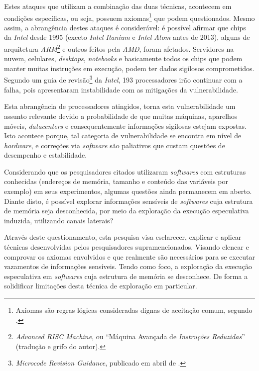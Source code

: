 \documentclass[
	article,			    %
	12pt,				    %
	oneside,			    %
	a4paper,			    %
	chapter=TITLE,		    %
	section=TITLE,		    %
	subsection=TITLE,	    %
	english,			    %
	brazil,				    %
	sumario=tradicional
]{abntex2}
\begin{document}
Estes ataques que utilizam a combinação das duas técnicas, acontecem em condições específicas, ou seja, possuem axiomas\footnote{Axiomas são regras lógicas consideradas dignas de aceitação comum, segundo .} que podem questionados. Mesmo assim, a abrangência destes ataques é considerável: é possível afirmar que chips da \emph{Intel} desde 1995 (exceto \emph{Intel Itanium} e \emph{Intel Atom} antes de 2013), alguns de arquitetura \emph{ARM}\footnote{\emph{Advanced RISC Machine}, ou ``Máquina Avançada de \emph{Instruções Reduzidas}'' (tradução e grifo do autor).} e outros feitos pela \emph{AMD}, foram afetados. Servidores na nuvem, celulares, \emph{desktops}, \emph{notebooks} e basicamente todos os chips que podem manter muitas instruções em execução, podem ter dados sigilosos comprometidos. Segundo um guia de revisão\footnote{\emph{Microcode Revision Guidance}, publicado em abril de \citeyear{intel-mug}.} da \emph{Intel}, 193 processadores irão continuar com a falha, pois apresentaram instabilidade com as mitigações da vulnerabilidade.

Esta abrangência de processadores atingidos, torna esta vulnerabilidade um assunto relevante devido a probabilidade de que muitas máquinas, aparelhos móveis, \emph{datacenters} e consequentemente informações sigilosas estejam expostas. Isto acontece porque, tal categoria de vulnerabilidade se encontra em nível de \emph{hardware}, e correções via \emph{software} são paliativos que custam questões de desempenho e estabilidade.

Considerando que os pesquisadores citados utilizaram \emph{softwares} com estruturas conhecidas (endereços de memória, tamanho e conteúdo das variáveis por exemplo) em seus experimentos, algumas questões ainda permanecem em aberto. Diante disto, é possível explorar informações sensíveis de \emph{softwares} cuja estrutura de memória seja desconhecida, por meio da exploração da execução especulativa induzida, utilizando canais laterais?

Através deste questionamento, esta pesquisa visa esclarecer, explicar e aplicar técnicas desenvolvidas pelos pesquisadores supramencionados. Visando elencar e comprovar os axiomas envolvidos e que realmente são necessários para se executar vazamentos de informações sensíveis. Tendo como foco, a exploração da execução especulativa em \emph{softwares} cuja estrutura de memória se desconhece. De forma a solidificar limitações desta técnica de exploração em particular.
\end{document}
